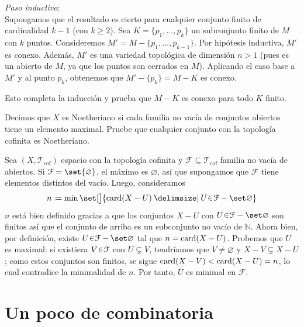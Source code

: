 \begin{sol}[Demostración]
\emph{Paso inductivo}:\\
Supongamos que el resultado es cierto para cualquier conjunto finito de cardinalidad $k-1$ (con $k \geq 2$). Sea $K = \{p_1, \dots, p_k\}$ un subconjunto finito de $M$ con $k$ puntos. Consideremos $M' = M - \{p_1, \dots, p_{k-1}\}$. Por hipótesis inductiva, $M'$ es conexo. Además, $M'$ es una variedad topológica de dimensión $n > 1$ (pues es un abierto de $M$, ya que los puntos son cerrados en $M$). Aplicando el caso base a $M'$ y al punto $p_k$, obtenemos que $M' - \{p_k\} = M - K$ es conexo.

Esto completa la inducción y prueba que $M - K$ es conexo para todo $K$ finito.
\end{sol}\clearpage

\begin{ejer}
Decimos que $X$ es Noetheriano si cada familia no vacía de conjuntos abiertos tiene un elemento maximal. Pruebe que cualquier conjunto con la topología cofinita es Noetheriano.
\end{ejer}
\begin{sol}[Demostración]
Sea $(X, \mathcal{T}_\text{cof})$ espacio con la topología cofinita y $\mathcal{F}\subseteq\mathcal{T}_\text{cof}$ familia no vacía de abiertos. Si $\mathcal{F} = \set{\varnothing}$, el máximo es $\varnothing$, así que supongamos que $\mathcal{F}$ tiene elementos distintos del vacío. Luego, consideramos
\[
    n \coloneq \min\set[\big]{\card(X-U) \given U \en \mathcal{F}-\set\varnothing}
\]
$n$ está bien definido gracias a que los conjuntos $X - U$ con $U \en \mathcal{F}-\set\varnothing$ son finitos así que el conjunto de arriba es un subconjunto no vacío de $\mathbb{N}$. Ahora bien, por definición, existe $U \en \mathcal{F}-\set\varnothing$ tal que $n = \operatorname{card}(X - U)$. Probemos que $U$ es maximal: si existiera $V \en \mathcal{F}$ con $U \subsetneq V$, tendríamos que $V \neq \varnothing$ y $X - V \subsetneq X - U$; como estos conjuntos son finitos, se sigue $\operatorname{card}(X - V) < \operatorname{card}(X - U) = n$, lo cual contradice la minimalidad de $n$. Por tanto, $U$ es minimal en $\mathcal{F}$. 
\end{sol}


\section{Un poco de combinatoria}

